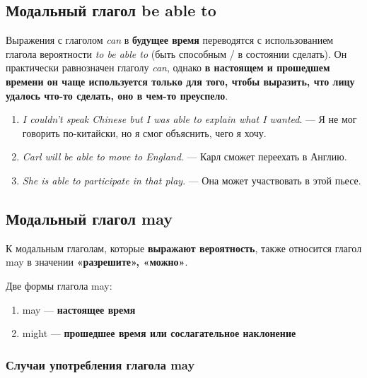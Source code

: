 \documentclass{article}
\begin{document}
\subsection{Модальный глагол \textbf{be able to}}

Выражения с глаголом \emph{can} в \textbf{будущее время} переводятся с использованием глагола вероятности \emph{to be able to} (быть способным / в состоянии сделать). Он практически равнозначен глаголу \emph{can}, однако \textbf{в настоящем и прошедшем времени он чаще используется только для того, чтобы выразить, что лицу удалось что-то сделать, оно в чем-то преуспело}.

\begin{enumerate}
	\item \emph{I couldn’t speak Chinese but I was able to explain what I wanted}. — Я не мог говорить по-китайски, но я смог объяснить, чего я хочу.
	\item \emph{Carl will be able to move to England}. — Карл сможет переехать в Англию.
	\item \emph{She is able to participate in that play}. — Она может участвовать в этой пьесе.
\end{enumerate}

\subsection{Модальный глагол \textbf{may}}

К модальным глаголам, которые \textbf{выражают вероятность}, также относится глагол may в значении \textbf{«разрешите», «можно»}. 

Две формы глагола may:

\begin{enumerate}
	\item may — \textbf{настоящее время}
	\item might — \textbf{прошедшее время или сослагательное наклонение}
\end{enumerate}

\subsubsection{Случаи употребления глагола may}
\end{document}
